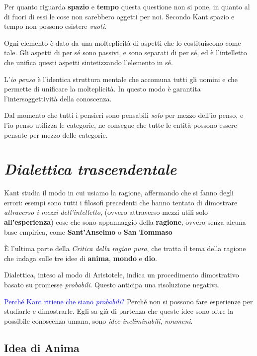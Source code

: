 \documentclass[a4paper, twoside, titlepage]{book}
\renewcommand{\emph}[1]{\textcolor{blue}{#1}}
\begin{document}
Per quanto riguarda \textbf{spazio} e \textbf{tempo} questa questione non si pone, in quanto al di fuori di essi le cose non sarebbero oggetti per noi.
Secondo Kant spazio e tempo non possono esistere \textit{vuoti}.

Ogni elemento è dato da una molteplicità di aspetti che lo costituiscono come tale. Gli aspetti di per sé sono passivi, e sono separati di per sé, ed è l’intelletto che unifica questi aspetti sintetizzando l’elemento in sé.

L’\textit{io penso} è l’identica struttura mentale che accomuna tutti gli uomini e che permette di unificare la molteplicità. In questo modo è garantita l’intersoggettività della conoscenza.

Dal momento che tutti i pensieri sono pensabili \textit{solo} per mezzo dell’io penso, e l’io penso utilizza le categorie, ne consegue che tutte le entità possono essere pensate per mezzo delle categorie.

\section{\textit{Dialettica trascendentale}}

Kant studia il modo in cui usiamo la ragione, affermando che si fanno degli errori: esempi sono tutti i filosofi precedenti che hanno tentato di dimostrare \textit{attraverso i mezzi dell’intelletto}, (ovvero attraverso mezzi utili solo \textbf{all’esperienza}) cose che sono appannaggio della \textbf{ragione}, ovvero senza alcuna base empirica, come \textbf{Sant’Anselmo} o \textbf{San Tommaso}

È l’ultima parte della \textit{Critica della ragion pura}, che tratta il tema della ragione che indaga sulle tre idee di \textbf{anima}, \textbf{mondo} e \textbf{dio}.

Dialettica, inteso al modo di Aristotele, indica un procedimento dimostrativo basato su promesse \textit{probabili}. Questo anticipa una risoluzione negativa.

\emph{Perché Kant ritiene che siano \textit{probabili}?} 
Perché non si possono fare esperienze per studiarle e dimostrarle. Egli sa già di partenza che queste idee sono oltre la possibile conoscenza umana, sono \textit{idee ineliminabili}, \textit{noumeni}.

\subsection{Idea di Anima}
\end{document}
